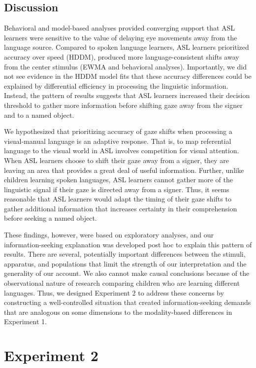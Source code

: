 \documentclass[,man,floatsintext]{apa6}
\begin{document}
\hypertarget{discussion}{%
\subsection{Discussion}\label{discussion}}

Behavioral and model-based analyses provided converging support that ASL
learners were sensitive to the value of delaying eye movements away from
the language source. Compared to spoken language learners, ASL learners
prioritized accuracy over speed (HDDM), produced more
language-consistent shifts away from the center stimulus (EWMA and
behavioral analyses). Importantly, we did not see evidence in the HDDM
model fits that these accuracy differences could be explained by
differential efficiency in processing the linguistic information.
Instead, the pattern of results suggests that ASL learners increased
their decision threshold to gather more information before shifting gaze
away from the signer and to a named object.

We hypothesized that prioritizing accuracy of gaze shifts when
processing a visual-manual language is an adaptive response. That is, to
map referential language to the visual world in ASL involves competition
for visual attention. When ASL learners choose to shift their gaze away
from a signer, they are leaving an area that provides a great deal of
useful information. Further, unlike children learning spoken languages,
ASL learners cannot gather more of the linguistic signal if their gaze
is directed away from a signer. Thus, it seems reasonable that ASL
learners would adapt the timing of their gaze shifts to gather
additional information that increases certainty in their comprehension
before seeking a named object.

These findings, however, were based on exploratory analyses, and our
information-seeking explanation was developed post hoc to explain this
pattern of results. There are several, potentially important differences
between the stimuli, apparatus, and populations that limit the strength
of our interpretation and the generality of our account. We also cannot
make causal conclusions because of the observational nature of research
comparing children who are learning different languages. Thus, we
designed Experiment 2 to address these concerns by constructing a
well-controlled situation that created information-seeking demands that
are analogous on some dimensions to the modality-based differences in
Experiment 1.

\hypertarget{experiment-2}{%
\section{Experiment 2}\label{experiment-2}}
\end{document}
